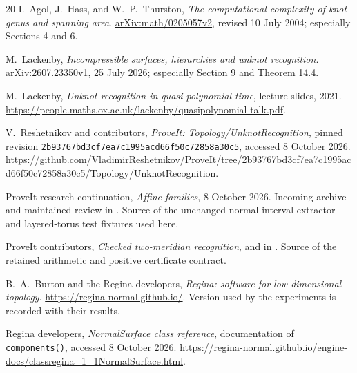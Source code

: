 \documentclass[11pt,a4paper]{article}
\theoremstyle{definition}\newtheorem{definition}[theorem]{Definition}
\theoremstyle{remark}\newtheorem{remark}[theorem]{Remark}
\newcommand{\code}[1]{\texttt{#1}}
\begin{document}
\begin{thebibliography}{20}
I.~Agol, J.~Hass, and W.~P.~Thurston,
\emph{The computational complexity of knot genus and spanning area}.
\href{https://arxiv.org/abs/math/0205057v2}{arXiv:math/0205057v2},
revised 10 July 2004; especially Sections 4 and 6.

M.~Lackenby,
\emph{Incompressible surfaces, hierarchies and unknot recognition}.
\href{https://arxiv.org/abs/2607.23350}{arXiv:2607.23350v1}, 25 July 2026;
especially Section 9 and Theorem 14.4.

M.~Lackenby, \emph{Unknot recognition in quasi-polynomial time},
lecture slides, 2021.
\url{https://people.maths.ox.ac.uk/lackenby/quasipolynomial-talk.pdf}.

V.~Reshetnikov and contributors, \emph{ProveIt: Topology/UnknotRecognition},
pinned revision \texttt{2b93767bd3cf7ea7c1995acd66f50c72858a30c5},
accessed 8 October 2026.
\url{https://github.com/VladimirReshetnikov/ProveIt/tree/2b93767bd3cf7ea7c1995acd66f50c72858a30c5/Topology/UnknotRecognition}.

ProveIt research continuation, \emph{Affine families}, 8 October 2026.
Incoming archive 
and maintained review  in
\cite{proveit}. Source of the unchanged normal-interval extractor and
layered-torus test fixtures used here.

ProveIt contributors, \emph{Checked two-meridian recognition},
 and 
in \cite{proveit}. Source of the retained arithmetic and positive
certificate contract.

B.~A.~Burton and the Regina developers, \emph{Regina: software for
low-dimensional topology}. \url{https://regina-normal.github.io/}.
Version used by the experiments is recorded with their results.

Regina developers, \emph{NormalSurface class reference},
documentation of \code{components()}, accessed 8 October 2026.
\url{https://regina-normal.github.io/engine-docs/classregina_1_1NormalSurface.html}.
\end{thebibliography}
\end{document}
